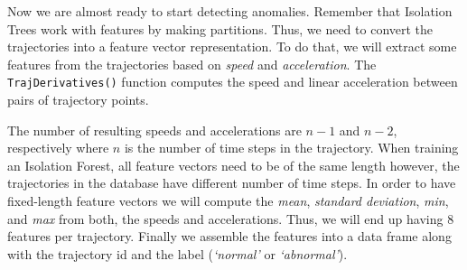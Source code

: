 \documentclass[
  11pt,
]{krantz}
\newenvironment{Shaded}{\begin{snugshade}}{\end{snugshade}}
\newcommand{\CommentTok}[1]{\textcolor[rgb]{0.37,0.37,0.37}{\textit{#1}}}
\newcommand{\FunctionTok}[1]{\textcolor[rgb]{0,0,0}{#1}}
\newcommand{\NormalTok}[1]{#1}
\newcommand{\OtherTok}[1]{\textcolor[rgb]{0.37,0.37,0.37}{#1}}
\newcommand{\SpecialCharTok}[1]{\textcolor[rgb]{0,0,0}{#1}}
\begin{document}
Now we are almost ready to start detecting anomalies. Remember that Isolation Trees work with features by making partitions. Thus, we need to convert the trajectories into a feature vector representation. To do that, we will extract some features from the trajectories based on \emph{speed} and \emph{acceleration}. The \texttt{TrajDerivatives()} function computes the speed and linear acceleration between pairs of trajectory points.

\begin{Shaded}
\end{Shaded}

The number of resulting speeds and accelerations are \(n-1\) and \(n-2\), respectively where \(n\) is the number of time steps in the trajectory. When training an Isolation Forest, all feature vectors need to be of the same length however, the trajectories in the database have different number of time steps. In order to have fixed-length feature vectors we will compute the \emph{mean}, \emph{standard deviation}, \emph{min}, and \emph{max} from both, the speeds and accelerations. Thus, we will end up having \(8\) features per trajectory. Finally we assemble the features into a data frame along with the trajectory id and the label (\emph{`normal'} or \emph{`abnormal'}).
\end{document}
